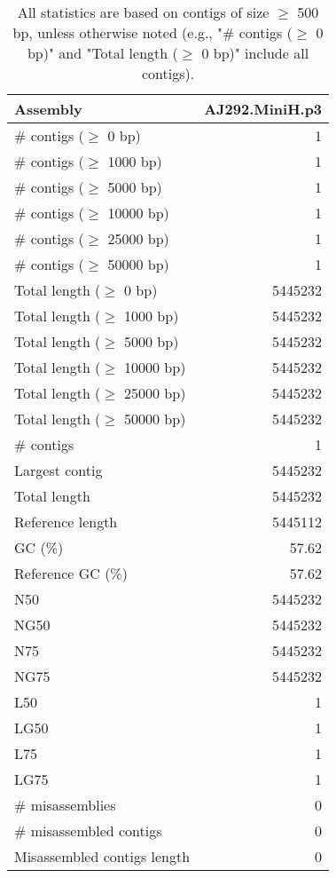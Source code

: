 \documentclass[12pt,a4paper]{article}
\begin{document}
\begin{table}[ht]
\begin{center}
\caption{All statistics are based on contigs of size $\geq$ 500 bp, unless otherwise noted (e.g., "\# contigs ($\geq$ 0 bp)" and "Total length ($\geq$ 0 bp)" include all contigs).}
\begin{tabular}{|l*{1}{|r}|}
\hline
Assembly & AJ292.MiniH.p3 \\ \hline
\# contigs ($\geq$ 0 bp) & 1 \\ \hline
\# contigs ($\geq$ 1000 bp) & 1 \\ \hline
\# contigs ($\geq$ 5000 bp) & 1 \\ \hline
\# contigs ($\geq$ 10000 bp) & 1 \\ \hline
\# contigs ($\geq$ 25000 bp) & 1 \\ \hline
\# contigs ($\geq$ 50000 bp) & 1 \\ \hline
Total length ($\geq$ 0 bp) & 5445232 \\ \hline
Total length ($\geq$ 1000 bp) & 5445232 \\ \hline
Total length ($\geq$ 5000 bp) & 5445232 \\ \hline
Total length ($\geq$ 10000 bp) & 5445232 \\ \hline
Total length ($\geq$ 25000 bp) & 5445232 \\ \hline
Total length ($\geq$ 50000 bp) & 5445232 \\ \hline
\# contigs & 1 \\ \hline
Largest contig & 5445232 \\ \hline
Total length & 5445232 \\ \hline
Reference length & 5445112 \\ \hline
GC (\%) & 57.62 \\ \hline
Reference GC (\%) & 57.62 \\ \hline
N50 & 5445232 \\ \hline
NG50 & 5445232 \\ \hline
N75 & 5445232 \\ \hline
NG75 & 5445232 \\ \hline
L50 & 1 \\ \hline
LG50 & 1 \\ \hline
L75 & 1 \\ \hline
LG75 & 1 \\ \hline
\# misassemblies & 0 \\ \hline
\# misassembled contigs & 0 \\ \hline
Misassembled contigs length & 0 \\ \hline

\end{tabular}
\end{center}
\end{table}
\end{document}
